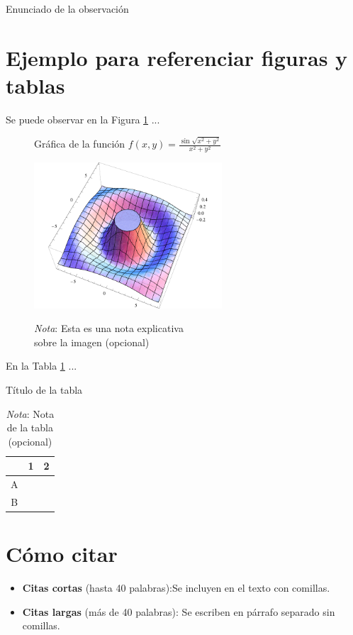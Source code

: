 \begin{obs}
	Enunciado de la observación
\end{obs}


\section{Ejemplo para referenciar figuras y tablas}\label{EtiquetaDeSeccion22}
\noindent Se puede observar en la Figura \ref{EtiquetaFigura} ...
\begin{figure}[h!]
	\caption{Gráfica de la función $f(x,y)=\frac{\sin{\sqrt{x^2+y^2}}}{x^2+y^2}$}
	\centering
	\includegraphics[width=7cm]{EjemploFigura.pdf}
	\label{EtiquetaFigura}
	\medskip
	\caption*{\emph{Nota}: Esta es una nota explicativa\\ sobre la imagen (opcional)}
\end{figure}

\noindent En la Tabla \ref{EtiquetaDeLaTabla} ...
\begin{table}[h!]
\caption{Título de la tabla}
\centering
\begin{tabular}{c|c|c}
	& 1 & 2 \\
	\hline
	A &  &  \\
	\hline
	B &  &  \\
\end{tabular}
\label{EtiquetaDeLaTabla}
\medskip
\caption*{\emph{Nota}: Nota de la tabla (opcional)}
\end{table}


\section{Cómo citar}\label{EtiquetaDeSeccion23}
\begin{itemize}
	\item \textbf{Citas cortas} (hasta 40 palabras):Se incluyen en el texto con comillas.
	\item \textbf{Citas largas} (más de 40 palabras): Se escriben en párrafo separado sin comillas.
\end{itemize}

